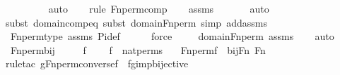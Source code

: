 \begin{isabellebody}
\ \ \ \ \ \ \ \isamarkupfalse%
\ auto{\isacharbrackleft}{\kern0pt}{}{\isacharbrackright}{\kern0pt}\isanewline
\ \ \ \isamarkupfalse%
{\isacharparenleft}{\kern0pt}rule\ Fn{\isacharunderscore}{\kern0pt}perm{\isacharunderscore}{\kern0pt}comp{\isacharparenright}{\kern0pt}\isanewline
\ \ \isamarkupfalse%
\ assms\isanewline
\ \ \ \ \ \isamarkupfalse%
\ auto{\isacharbrackleft}{\kern0pt}{}{\isacharbrackright}{\kern0pt}\isanewline
\ \ \isamarkupfalse%
{\isacharparenleft}{\kern0pt}subst\ domain{\isacharunderscore}{\kern0pt}comp{\isacharunderscore}{\kern0pt}eq{\isacharcomma}{\kern0pt}\ subst\ domain{\isacharunderscore}{\kern0pt}Fn{\isacharunderscore}{\kern0pt}perm{\isacharprime}{\kern0pt}{\isacharcomma}{\kern0pt}\ simp\ add{\isacharcolon}{\kern0pt}assms{\isacharparenright}{\kern0pt}\isanewline
\ \ \isamarkupfalse%
\ Fn{\isacharunderscore}{\kern0pt}perm{\isacharprime}{\kern0pt}{\isacharunderscore}{\kern0pt}type\ assms\ Pi{\isacharunderscore}{\kern0pt}def\ \isanewline
\ \ \ \isamarkupfalse%
\ force\ \isanewline
\ \ \isamarkupfalse%
\ domain{\isacharunderscore}{\kern0pt}Fn{\isacharunderscore}{\kern0pt}perm{\isacharprime}{\kern0pt}\ assms\isanewline
\ \ \isamarkupfalse%
\ auto%
\endisatagproof
{\isafoldproof}%
%
\isadelimproof
\isanewline
%
\endisadelimproof
\isanewline
{}\isamarkupfalse%
\ Fn{\isacharunderscore}{\kern0pt}perm{\isacharprime}{\kern0pt}{\isacharunderscore}{\kern0pt}bij\ {\isacharcolon}{\kern0pt}\ \isanewline
\ \ \ f\ \isanewline
\ \ \ {\isachardoublequoteopen}f\ {\isasymin}\ nat{\isacharunderscore}{\kern0pt}perms{\isachardoublequoteclose}\isanewline
\ \ \ {\isachardoublequoteopen}Fn{\isacharunderscore}{\kern0pt}perm{\isacharprime}{\kern0pt}{\isacharparenleft}{\kern0pt}f{\isacharparenright}{\kern0pt}\ {\isasymin}\ bij{\isacharparenleft}{\kern0pt}Fn{\isacharcomma}{\kern0pt}\ Fn{\isacharparenright}{\kern0pt}{\isachardoublequoteclose}\ \isanewline
%
\isadelimproof
\ \ %
\endisadelimproof
%
\isatagproof
{}\isamarkupfalse%
{\isacharparenleft}{\kern0pt}rule{\isacharunderscore}{\kern0pt}tac\ g{\isacharequal}{\kern0pt}{\isachardoublequoteopen}Fn{\isacharunderscore}{\kern0pt}perm{\isacharprime}{\kern0pt}{\isacharparenleft}{\kern0pt}converse{\isacharparenleft}{\kern0pt}f{\isacharparenright}{\kern0pt}{\isacharparenright}{\kern0pt}{\isachardoublequoteclose}\ \ fg{\isacharunderscore}{\kern0pt}imp{\isacharunderscore}{\kern0pt}bijective{\isacharparenright}{\kern0pt}\isanewline

\end{isabellebody}
